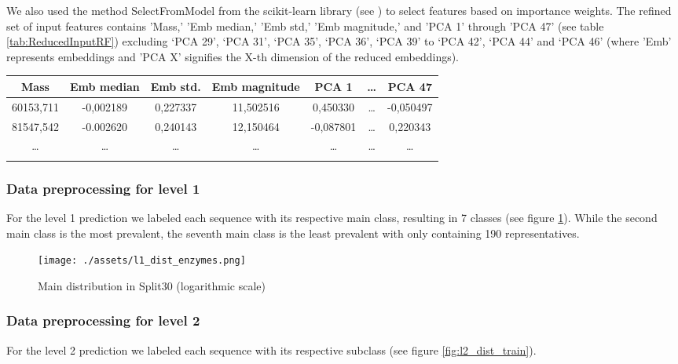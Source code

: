 \documentclass{bioinfo}
\begin{document}
\begin{methods}
We also used the method SelectFromModel from the scikit-learn library (see \cite{scikit-learn})
to select features based on importance weights. 
The refined set of input features contains 
'Mass,' 'Emb median,' 'Emb std,' 'Emb magnitude,' and 'PCA 1' through 'PCA 47' (see table \ref{tab:ReducedInputRF}) excluding ‘PCA 29’, ‘PCA 31’, ‘PCA 35’, 
‘PCA 36’, ‘PCA 39’ to ‘PCA 42’, ‘PCA 44’ and ‘PCA 46’ (where 'Emb' represents embeddings and 'PCA X' signifies the X-th dimension of the reduced embeddings).

\begin{table}[!htbp]
\setlength{\tabcolsep}{2pt}
 {
	\begin{tabular}{@{}ccccccc@{}}
		\toprule 
		Mass & Emb median & Emb std. & Emb magnitude & PCA 1 & \dots & PCA 47\\
		\midrule
		60153,711 & -0,002189 & 0,227337 & 11,502516 & 0,450330 & \dots & -0,050497\\
		81547,542 & -0.002620 & 0,240143 & 12,150464 & -0,087801 & \dots & 0,220343 \\
		\dots & \dots & \dots & \dots & \dots & \dots & \dots \\
		\botrule
    \end{tabular}
}{}
\end{table}

\subsubsection{Data preprocessing for level 1}
For the level 1 prediction we labeled each sequence with its respective main class,
resulting in 7 classes (see figure \ref{fig:l1_dist_train}).
While the second main class is the most prevalent, 
the seventh main class is the least prevalent with only
containing 190 representatives.

\begin{figure}[!htpb]
\texttt{[image: ./assets/l1\_dist\_enzymes.png]}
\caption{Main distribution in Split30 (logarithmic scale)}\label{fig:l1_dist_train}
\end{figure}


\subsubsection{Data preprocessing for level 2}
For the level 2 prediction we labeled each sequence with its respective subclass (see figure \ref{fig:l2_dist_train}).


\end{methods}
\end{document}

